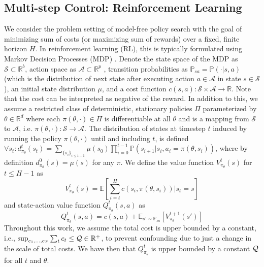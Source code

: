 \subsection{Multi-step Control: Reinforcement Learning}
\label{sec:rl-problem}
We consider the problem setting of model-free policy search with the goal of
minimizing sum of costs (or maximizing sum of rewards) over a fixed,
finite horizon $H$. In reinforcement learning (RL), this is typically
formulated using Markov Decision Processes (MDP)
\citep{sutton1998introduction}. Denote the state space of the MDP as
$\mathcal{S} \subset 
\mathbb{R}^b$, action space as $\mathcal{A} \subset  \mathbb{R}^p$
, transition probabilities as
$\mathbb{P}_{sa} = \mathbb{P}(\cdot|s, a)$ (which is the distribution of next state after
executing action $a \in \mathcal{A}$ in state $s \in \mathcal{S}$), an
initial state distribution $\mu$, and a cost function $c(s,a) :
\mathcal{S} \times \mathcal{A} \rightarrow \mathbb{R}$. Note that the
cost can be interpreted as negative of the reward. In addition to
this, we assume a restricted class of deterministic, stationary
policies $\Pi$ parameterized by $\theta \in \mathbb{R}^d$ where each
$\pi(\theta, \cdot) \in \Pi$ is differentiable at all $\theta$ and is a mapping from $\mathcal{S}$ to
$\mathcal{A}$, i.e. $\pi(\theta, \cdot): \mathcal{S} \rightarrow
\mathcal{A}$. The distribution of states at timestep $t$ induced by
running the policy $\pi(\theta, \cdot)$ until and including $t$, is
defined $\forall s_t: d_{\pi_\theta}^t(s_t) = \sum_{\{s_i\}_{i \leq
    t-1}} \mu(s_0) \prod_{i=0}^{t-1} \mathbb{P}(s_{i+1}|s_i, a_i =
\pi(\theta, s_i))$, where by definition $d_{\pi_\theta}^0(s) = \mu(s)$
for any $\pi$. We define the value function $V^t_{\pi_\theta}(s)$ for $t \leq H-1$ as 
%
\begin{equation*}
  V^t_{\pi_\theta}(s) = \mathbb{E}[\sum_{i=t}^H c(s_i, \pi(\theta,
s_i))|s_t = s]
\end{equation*}
and state-action value function $Q^t_{\pi_\theta}(s, a)$ as
\begin{equation*}
  Q^t_{\pi_\theta}(s, a) = c(s, a) + \mathbb{E}_{s' \sim
                           \mathbb{P}_{sa}}[V^{t+1}_{\pi_\theta}(s')]
\end{equation*}
Throughout this work, we assume the total cost is upper bounded by a constant, i.e., $\sup_{c_1,\dots, c_T}\sum_{t} c_t \leq \mathcal{Q}\in\mathbb{R}^+$, to prevent confounding due to just a change in the scale of total costs. We have then that $Q^t_{\pi_\theta}$ is upper bounded by a constant $\mathcal{Q}$ for all $t$ and $\theta$.

